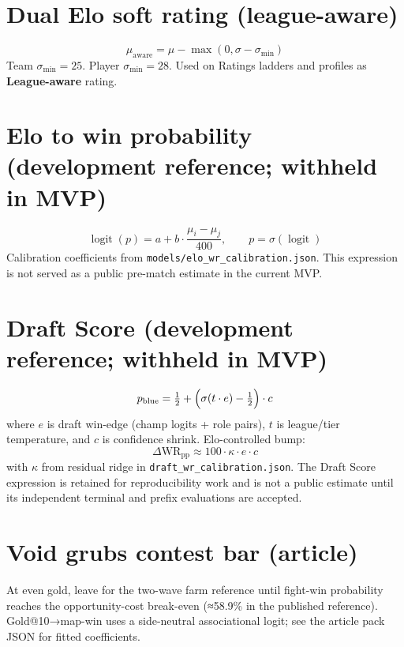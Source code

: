 
\section{Dual Elo soft rating (league-aware)}
\label{eq:soft-mu}
\[
\mu_{\mathrm{aware}}
=
\mu - \max(0,\sigma - \sigma_{\min})
\]
Team \(\sigma_{\min}=25\). Player \(\sigma_{\min}=28\).
Used on Ratings ladders and profiles as \textbf{League-aware} rating.

\section{Elo to win probability (development reference; withheld in MVP)}
\label{eq:elo-wr}
\[
\operatorname{logit}(p)
=
a + b\cdot\frac{\mu_i-\mu_j}{400},
\qquad
p=\sigma(\operatorname{logit})
\]
Calibration coefficients from \texttt{models/elo\_wr\_calibration.json}. This expression is not
served as a public pre-match estimate in the current MVP.

\section{Draft Score (development reference; withheld in MVP)}
\label{eq:draft}
\[
p_{\mathrm{blue}}
=
\tfrac12 + \Bigl(\sigma(t\cdot e)- \tfrac12\Bigr)\cdot c
\]
where \(e\) is draft win-edge (champ logits + role pairs), \(t\) is league/tier temperature,
and \(c\) is confidence shrink.
Elo-controlled bump:
\[
\Delta\mathrm{WR}_{\mathrm{pp}}
\approx
100\cdot \kappa\cdot e\cdot c
\]
with \(\kappa\) from residual ridge in \texttt{draft\_wr\_calibration.json}. The Draft Score
expression is retained for reproducibility work and is not a public estimate until its independent
terminal and prefix evaluations are accepted.

\section{Void grubs contest bar (article)}
\label{eq:grubs}
At even gold, leave for the two-wave farm reference until fight-win probability reaches
the opportunity-cost break-even (≈58.9\% in the published reference). Gold@10→map-win uses a
side-neutral associational logit; see the article pack JSON for fitted coefficients.
